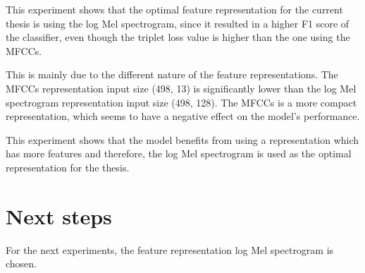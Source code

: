 \documentclass[twocolumn]{article}
\begin{document}
This experiment shows that the optimal feature representation for the current thesis is using the log Mel spectrogram, since it resulted in a higher F1 score of the classifier, even though the triplet loss value is higher than the one using the MFCCs. 

This is mainly due to the different nature of the feature representations. The MFCCs representation input size (498, 13) is significantly lower than the log Mel spectrogram representation input size (498, 128). The MFCCs is a more compact representation, which seems to have a negative effect on the model's performance.

This experiment shows that the model benefits from using a representation which has more features and therefore, the log Mel spectrogram is used as the optimal representation for the thesis.

\section{Next steps}

For the next experiments, the feature representation log Mel spectrogram is chosen.
\end{document}
